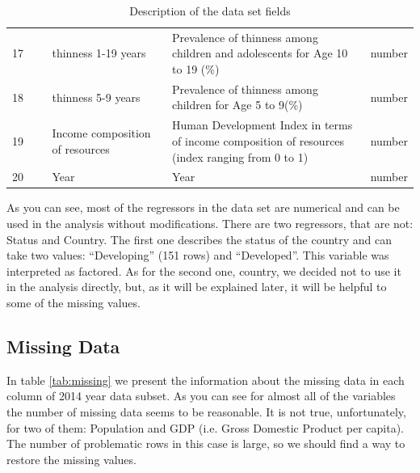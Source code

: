 \begin{table}
\begin{tabular}{@{}p{0.1\linewidth}  p{0.3\linewidth}p{0.5\linewidth}p{0.1\linewidth}@{}}
    17 & thinness 1-19 years & Prevalence of thinness among children and adolescents for Age 10 to 19 (\%) & number \\
    18 & thinness 5-9 years & Prevalence of thinness among children for Age 5 to 9(\%) & number \\
    19 & Income composition of resources & Human Development Index in terms of income composition of resources (index ranging from 0 to 1) & number \\
    20 & Year                     & Year & number \\
    \bottomrule
  \end{tabular}
  \caption{Description of the data set fields}
  \label{tab:description}
\end{table}


As you can see, most of the regressors in the data set are numerical and can be used in the analysis without modifications. There are two regressors, that are not: Status and Country. The first one describes the status of the country and can take two values: ``Developing'' (151 rows) and ``Developed''. This variable was interpreted as factored. As for the second one, country, we decided not to use it in the analysis directly, but, as it will be explained later, it will be helpful to some of the missing values.

\subsection{Missing Data}
\label{sec:missing-data}

In table \ref{tab:missing} we present the information about the missing data in each column of 2014 year data subset. As you can see for almost all of the variables the number of missing data seems to be reasonable. It is not true, unfortunately, for two of them: Population and GDP (i.e. Gross Domestic Product per capita). The number of problematic rows in this case is large, so we should find a way to restore the missing values.

